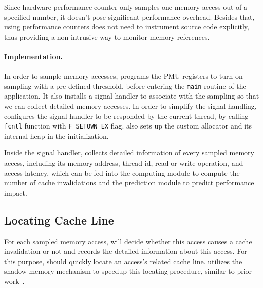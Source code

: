 Since hardware performance counter only samples one memory access out of a specified number, it doesn't pose significant performance overhead. Besides that, using performance counters does not need to instrument source code explicitly, thus providing a non-intrusive way to monitor memory references. 

\paragraph{Implementation.} 

In order to sample memory accesses, \cheetah{} programs the PMU registers to turn on sampling with a pre-defined threshold, before entering the \texttt{main} routine of the application. It also installs a signal handler to associate with the sampling so that we can collect detailed memory accesses. In order to simplify the signal handling, \Cheetah{} configures the signal handler to be responded by the current thread, by calling \texttt{fcntl} function with \texttt{F\_SETOWN\_EX} flag. \cheetah{} also sets up the custom allocator and its internal heap in the initialization.

Inside the signal handler, \Cheetah{} collects detailed information of every sampled memory access, including its memory address, thread id, read or write operation, and access latency, which can be fed into the computing module to compute the number of cache invalidations and the prediction module to predict performance impact.

\subsection{Locating Cache Line}
\label{sec:shadow}

For each sampled memory access, \cheetah{} will decide whether this access causes a cache invalidation or not and records the detailed information about this access. For this purpose, \cheetah{} should quickly locate an access's related cache line. \Cheetah{} utilizes the shadow memory mechanism to speedup this locating procedure, similar to prior work~\cite{qinzhao, Predator}. 

